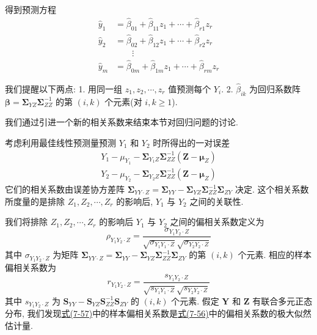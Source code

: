 
得到预测方程
\[
\begin{aligned}
\hat{y}_1&=\hat{\beta}_{01}+\hat{\beta}_{11}z_1+\cdots+\hat{\beta}_{r1}z_r\\
\hat{y}_2&=\hat{\beta}_{02}+\hat{\beta}_{12}z_1+\cdots+\hat{\beta}_{r2}z_r\\
&\qquad\vdots\\
\hat{y}_m&=\hat{\beta}_{0m}+\hat{\beta}_{1m}z_1+\cdots+\hat{\beta}_{rm}z_r
\end{aligned}
\]

我们提醒以下两点:
1. 用同一组 $z_1,z_2,\cdots,z_r$ 值预测每个 $Y_i$.
2. $\hat{\beta}_{ik}$ 为回归系数阵 $\boldsymbol{\beta}=\boldsymbol{\Sigma}_{YZ}\boldsymbol{\Sigma}_{ZZ}^{-1}$ 的第 $(i,k)$ 个元素(对 $i,k\geqslant 1$).

我们通过引进一个新的相关系数来结束本节对回归问题的讨论.


考虑利用最佳线性预测量预测 $Y_1$ 和 $Y_2$ 时所得出的一对误差
\[
\begin{aligned}
Y_1-\mu_{Y_1}-\boldsymbol{\Sigma}_{Y_1Z}\boldsymbol{\Sigma}_{ZZ}^{-1}(\mathbf{Z}-\boldsymbol{\mu}_Z)\\
Y_2-\mu_{Y_2}-\boldsymbol{\Sigma}_{Y_2Z}\boldsymbol{\Sigma}_{ZZ}^{-1}(\mathbf{Z}-\boldsymbol{\mu}_Z)
\end{aligned}
\]
它们的相关系数由误差协方差阵 $\boldsymbol{\Sigma}_{YY\cdot Z}=\boldsymbol{\Sigma}_{YY}-\boldsymbol{\Sigma}_{YZ}\boldsymbol{\Sigma}_{ZZ}^{-1}\boldsymbol{\Sigma}_{ZY}$ 决定. 这个相关系数所度量的是排除 $Z_1,Z_2,\cdots,Z_r$ 的影响后, $Y_1$ 与 $Y_2$ 之间的关联性.

我们将排除 $Z_1,Z_2,\cdots,Z_r$ 的影响后 $Y_1$ 与 $Y_2$ 之间的偏相关系数定义为
\label{eq:7-56}
\begin{equation}
\rho_{Y_1Y_2\cdot Z}=\frac{\sigma_{Y_1Y_2\cdot Z}}{\sqrt{\sigma_{Y_1Y_1\cdot Z}}\sqrt{\sigma_{Y_2Y_2\cdot Z}}} \tag{7-56}
\end{equation}
其中 $\sigma_{Y_1Y_2\cdot Z}$ 为矩阵 $\boldsymbol{\Sigma}_{YY\cdot Z}=\boldsymbol{\Sigma}_{YY}-\boldsymbol{\Sigma}_{YZ}\boldsymbol{\Sigma}_{ZZ}^{-1}\boldsymbol{\Sigma}_{ZY}$ 的第 $(i,k)$ 个元素. 相应的样本偏相关系数为
\label{eq:7-57}
\begin{equation}
r_{Y_1Y_2\cdot Z}=\frac{s_{Y_1Y_2\cdot Z}}{\sqrt{s_{Y_1Y_1\cdot Z}}\sqrt{s_{Y_2Y_2\cdot Z}}} \tag{7-57}
\end{equation}
其中 $s_{Y_1Y_2\cdot Z}$ 为 $\mathbf{S}_{YY}-\mathbf{S}_{YZ}\mathbf{S}_{ZZ}^{-1}\mathbf{S}_{ZY}$ 的 $(i,k)$ 个元素. 假定 $\mathbf{Y}$ 和 $\mathbf{Z}$ 有联合多元正态分布, 我们发现\hyperref[eq:7-57]{式(7-57)}中的样本偏相关系数是\hyperref[eq:7-56]{式(7-56)}中的偏相关系数的极大似然估计量.


